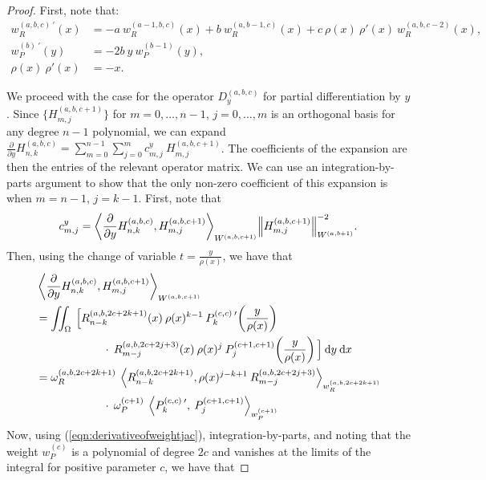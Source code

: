 \documentclass[11pt, oneside]{article}   	%
\newcommand{\pddy}{\frac{\partial}{\partial y}}
\newcommand{\hdop}{H}
\newcommand{\jac}{{P}}
\newcommand{\genjac}{R}
\newcommand{\genjacnmk}{\genjac_{n-k}}
\newcommand{\genjacmmj}{\genjac_{m-j}}
\newcommand{\genjacw}{w_\genjac}
\newcommand{\jacw}{w_P}
\newcommand{\normgenjac}{\omega_\genjac}
\newcommand{\normjac}{\omega_P}
\newcommand{\hdopnkabc}{\hdop_{n,k}^{(a,b,c)}}
\begin{document}
\begin{proof}
First, note that:
\begin{align}
	\genjacw^{(a,b,c) \: \prime}(x) &= - a \: \genjacw^{(a-1,b,c)}(x) + b \: \genjacw^{(a,b-1,c)}(x) + c \: \rho(x) \: \rho'(x) \:\genjacw^{(a,b,c-2)}(x), \label{eqn:derivativeofweightgenjac} \\
	\jacw^{(b) \: \prime}(y) &= - 2b \: y \: \jacw^{(b-1)}(y), \label{eqn:derivativeofweightjac} \\
	\rho(x) \: \rho'(x) &= -x. \label{eqn:rhoderivative}
\end{align}

We proceed with the case for the operator $D_y^{(a,b,c)}$ for partial differentiation by $y$. Since $\{\hdop^{(a,b,c+1)}_{m,j}\}$ for $m = 0,\dots,n-1$, $j = 0,\dots,m$ is an orthogonal basis for any degree $n-1$ polynomial, we can expand $\pddy \hdopnkabc = \sum_{m=0}^{n-1} \sum_{j=0}^m c_{m,j}^y \: \hdop^{(a, b, c+1)}_{m,j}$. The coefficients of the expansion are then the entries of the relevant operator matrix. We can use an integration-by-parts argument to show that the only non-zero coefficient of this expansion is when $m = n-1$, $j = k-1$. First, note that
\begin{align*}
	c_{m,j}^y = {\ip<\pddy \hdopnkabc, \hdop^{(a, b, c+1)}_{m,j} >_{W^{(a, b, c+1)}}}{\norm{\hdop^{(a, b, c+1)}_{m,j}}^{-2}_{W^{(a, b+1)}}}.
\end{align*}
Then, using the change of variable $t = \frac{y}{\rho(x)}$, we have that
\begin{align*}
	&\ip<\pddy \hdopnkabc, \hdop^{(a, b, c+1)}_{m,j} >_{W^{(a, b, c+1)}} \\
	&= \iint_\Omega \: \Big[ \genjacnmk^{(a,b,2c+2k+1)}(x) \: \rho(x)^{k-1} \: \jac_k^{(c,c) \: \prime}\fpr(\frac{y}{\rho(x)}) \\
	& \quad \quad \quad \quad \quad \quad \cdot \: \genjacmmj^{(a,b,2c+2j+3)}(x) \: \rho(x)^{j} \: \jac_j^{(c+1,c+1)}\fpr(\frac{y}{\rho(x)}) \Big] \: \D y \: \D x \\
	&= \normgenjac^{(a, b, 2c+2k+1)} \: \ip< \genjacnmk^{(a,b,2c+2k+1)}, \rho(x)^{j-k+1} \: \genjacmmj^{(a,b,2c+2j+3)} >_{\genjacw^{(a,b,2c+2k+1)}} \\
	&\quad \quad \quad \quad \quad \quad \cdot \: \normjac^{(c+1)} \: \ip< \jac_k^{(c,c) \: \prime}, \: \jac_{j}^{(c+1,c+1)} >_{\jacw^{(c+1)}}
\end{align*}
Now, using (\ref{eqn:derivativeofweightjac}), integration-by-parts, and noting that the weight $\jacw^{(c)}$ is a polynomial of degree $2c$ and vanishes at the limits of the integral for positive parameter $c$, we have that

\end{proof}
\end{document}
